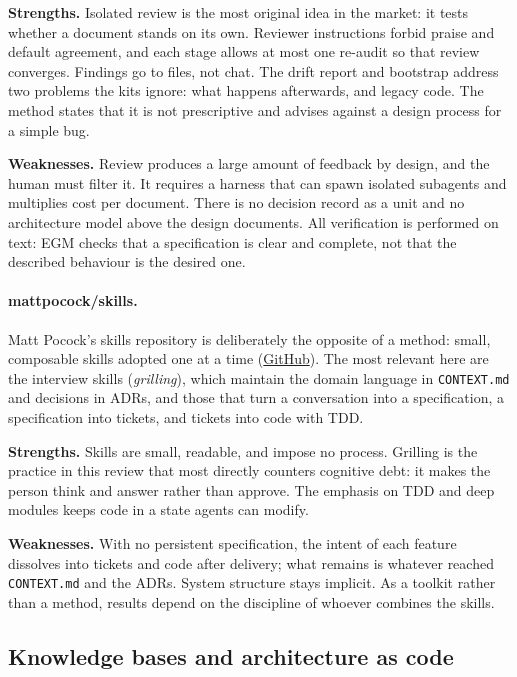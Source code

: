 \documentclass[11pt]{article}
\begin{document}
\textbf{Strengths.} Isolated review is the most original idea in the market: it tests whether a document stands on its own. Reviewer instructions forbid praise and default agreement, and each stage allows at most one re-audit so that review converges. Findings go to files, not chat. The drift report and bootstrap address two problems the kits ignore: what happens afterwards, and legacy code. The method states that it is not prescriptive and advises against a design process for a simple bug.

\textbf{Weaknesses.} Review produces a large amount of feedback by design, and the human must filter it. It requires a harness that can spawn isolated subagents and multiplies cost per document. There is no decision record as a unit and no architecture model above the design documents. All verification is performed on text: EGM checks that a specification is clear and complete, not that the described behaviour is the desired one.

\paragraph{mattpocock/skills.} Matt Pocock's skills repository is deliberately the opposite of a method: small, composable skills adopted one at a time (\href{https://github.com/mattpocock/skills}{GitHub}). The most relevant here are the interview skills (\emph{grilling}), which maintain the domain language in \texttt{CONTEXT.md} and decisions in ADRs, and those that turn a conversation into a specification, a specification into tickets, and tickets into code with TDD.

\textbf{Strengths.} Skills are small, readable, and impose no process. Grilling is the practice in this review that most directly counters cognitive debt: it makes the person think and answer rather than approve. The emphasis on TDD and deep modules keeps code in a state agents can modify.

\textbf{Weaknesses.} With no persistent specification, the intent of each feature dissolves into tickets and code after delivery; what remains is whatever reached \texttt{CONTEXT.md} and the ADRs. System structure stays implicit. As a toolkit rather than a method, results depend on the discipline of whoever combines the skills.

\subsection{Knowledge bases and architecture as code}
\end{document}
